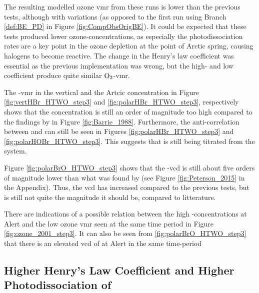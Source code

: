 The resulting modelled ozone \acrshort{vmr} from these runs is lower than the previous tests, although with variations (as opposed to the first run using Branch \ref{def:BE_PD} in Figure \ref{fig:CompObsOrigBE}). It could be expected that these tests produced lower ozone-concentrations, as especially the photodissociation rates are a key point in the ozone depletion at the point of Arctic spring, causing halogens to become reactive. The change in the Henry's law coefficient was essential as the previous implementation was wrong, but the high- and low coefficient produce quite similar $\mathrm{O_3}$-\acrshort{vmr}. 

\medskip

The -\acrshort{vmr} in the vertical and the Artcic concentration in Figure \ref{fig:vertHBr_HTWO_step3} and \ref{fig:polarHBr_HTWO_step3}, respectively shows that the  concentration is still an order of magnitude too high compared to the findings by \cite{barrie} in Figure \ref{fig:Barrie_1988}. Furthermore, the anti-correlation between  and  can still be seen in Figures \ref{fig:polarHBr_HTWO_step3} and \ref{fig:polarHOBr_HTWO_step3}. This suggests that  is still being titrated from the system. 

\medskip

Figure \ref{fig:polarBrO_HTWO_step3} shows that the -\acrshort{vcd} is still about five orders of magnitude lower than what was found by \cite{Peterson2015} (see Figure \ref{fig:Peterson_2015} in the Appendix). Thus, the \acrshort{vcd} has increased compared to the previous tests, but is still not quite the magnitude it should be, compared to litterature. 

\medskip

There are indications of a possible relation between the high -concentrations at Alert and the low ozone \acrshort{vmr} seen at the same time period in Figure \ref{fig:ozone_2001_step3}. It can also be seen from \ref{fig:polarBrO_HTWO_step3} that there is an elevated \acrshort{vcd} of  at Alert in the same  time-period

\subsection{Higher Henry's Law Coefficient and Higher Photodissociation of }\label{sec:disc_step4}

